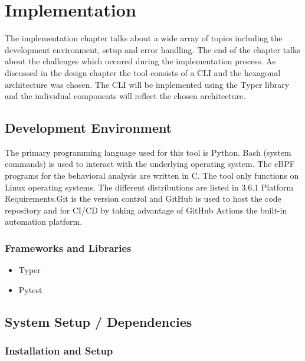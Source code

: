 \section{Implementation}

The implementation chapter talks about a wide array of topics including the development environment, setup and error handling. The end of the chapter talks about the challenges which occured during the implementation process. \newline\newline As discussed in the design chapter the tool consists of a CLI and the hexagonal architecture was chosen. The CLI will be implemented using the Typer library  and the individual components will reflect the chosen architecture.

\subsection{Development Environment}

The primary programming language used for this tool is Python. Bash (system commands) is used to interact with the underlying operating system. The eBPF programs for the behavioral analysis are written in C. \newline\newline The tool only functions on Linux operating systems. The different distributions are listed in 3.6.1 Platform Requirements.\newline\newline Git is the version control and GitHub is used to host the code repository and for CI/CD by taking advantage of GitHub Actions the built-in automation platform.

\subsubsection{Frameworks and Libraries}

\begin{itemize}
	\item Typer
	\item Pytest
\end{itemize}

\subsection{System Setup / Dependencies}

\subsubsection{Installation and Setup}

